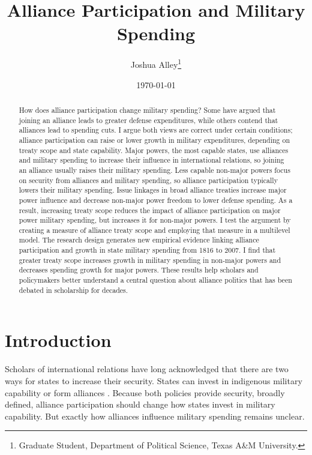 \documentclass[12pt]{article}
\title{\textbf{Alliance Participation and Military Spending}}
\author{Joshua Alley\footnote{Graduate Student,
Department of Political Science, Texas A\&M University.}}
\date{{\normalsize \today}}
\begin{document}
\maketitle 

\doublespace 

\begin{abstract}
How does alliance participation change military spending? 
Some have argued that joining an alliance leads to greater defense expenditures, while others contend that alliances lead to spending cuts.
I argue both views are correct under certain conditions; alliance participation can raise or lower growth in military expenditures, depending on treaty scope and state capability. 
Major powers, the most capable states, use alliances and military spending to increase their influence in international relations, so joining an alliance usually raises their military spending. 
Less capable non-major powers focus on security from alliances and military spending, so alliance participation typically lowers their military spending. 
Issue linkages in broad alliance treaties increase major power influence and decrease non-major power freedom to lower defense spending. 
As a result, increasing treaty scope reduces the impact of alliance participation on major power military spending, but increases it for non-major powers. 
I test the argument by creating a measure of alliance treaty scope and employing that measure in a multilevel model. 
The research design generates new empirical evidence linking alliance participation and growth in state military spending from 1816 to 2007. 
I find that greater treaty scope increases growth in military spending in non-major powers and decreases spending growth for major powers.  
These results help scholars and policymakers better understand a central question about alliance politics that has been debated in scholarship for decades. 
\end{abstract}


\newpage 


\section{Introduction}


Scholars of international relations have long acknowledged that there are two ways for states to increase their security. 
States can invest in indigenous military capability or form alliances \citep{Morgenthau1948, Altfield1984, Morrow1993}.
Because both policies provide security, broadly defined, alliance participation should change how states invest in military capability. 
But exactly how alliances influence military spending remains unclear. 
\end{document}
